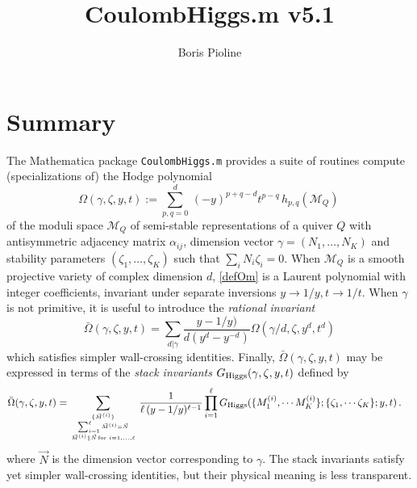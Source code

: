 \documentclass[12pt]{article}
\title{CoulombHiggs.m v5.1}
\author{Boris Pioline}
\newcommand{\be}{\begin{equation}}
\newcommand{\ee}{\end{equation}}
\newcommand\bOm{\bar\Omega}
\newcommand{\cM}{\mathcal{M}}
\newcommand{\gR}{G_{\rm Higgs}}
\begin{document}
\maketitle

\baselineskip 15pt

\tableofcontents

\medskip

\section{Summary}

The  {\sc Mathematica} package {\tt CoulombHiggs.m} provides a suite of routines compute (specializations of) the Hodge polynomial 
\be
\label{defOm}
\Omega(\gamma,\zeta,y,t) := 
\sum_{p,q=0}^{d}\, (-y)^{p+q-d} t^{p-q}\, h_{p,q}(\cM_Q)\, 
\ee
of the moduli space $\cM_Q$ of semi-stable representations of a quiver $Q$ with antisymmetric
adjacency matrix $\alpha_{ij}$,  dimension vector $\gamma=(N_1,\dots, N_K)$ and stability parameters $(\zeta_1,\dots, \zeta_K)$ such that $\sum_i N_i \zeta_i=0$. When $\cM_Q$ is 
a smooth projective variety of complex dimension $d$, \eqref{defOm} is a Laurent polynomial  with integer coefficients, invariant under separate inversions $y\to 1/y, t\to 1/t$. When $\gamma$ is not primitive, it is useful to introduce the {\it rational invariant}
\be
\label{defbOm}
\bOm(\gamma,\zeta,y,t)=\sum_{d|\gamma} \frac{y-1/y)}{d(y^d-y^{-d})} \Omega(\gamma/d,\zeta,y^d,t^d)\ee 
which satisfies simpler wall-crossing identities. Finally, $\bOm(\gamma,\zeta,y,t)$ may be expressed 
in terms of the {\it stack invariants} $G_{\rm Higgs}(\gamma,\zeta,y,t)$ defined by \cite[(4.1)]{Manschot:2013rx}
\be
\label{eq:inversestackinv}
\begin{split}
\bOm(\gamma,\zeta,y,t) 
  =& %
  \sum_{\{\vec M^{(i)}\} \atop {
  \sum_{i=1}^\ell \vec M^{(i)}=\vec N \atop  \vec M^{(i)}\parallel \vec N
  \,\mathrm{for}\,\, i=1,\dots,\ell}}
\frac{1}{\ell\,(y-1/y)^{\ell-1}}  
\prod_{i=1}^\ell 
\gR(\{ M^{(i)}_1, \cdots M^{(i)}_K \};
\{\zeta_1, \cdots \zeta_K\};y,t)
\, .  
\end{split}
\ee
where $\vec N$ is the dimension vector corresponding to $\gamma$. The stack invariants 
satisfy yet simpler wall-crossing identities, but their physical meaning is less transparent.

\medskip
\end{document}
